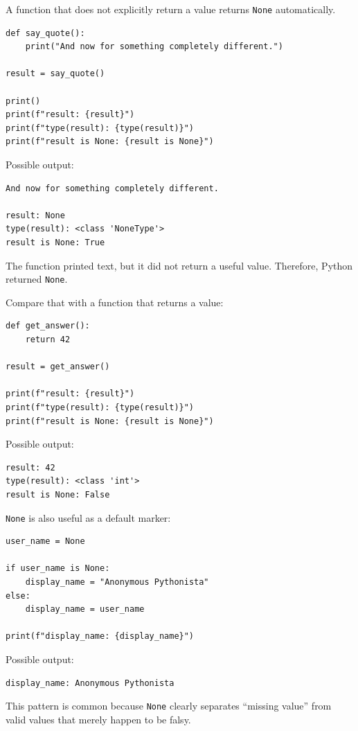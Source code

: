 A function that does not explicitly return a value returns \texttt{None} automatically.

\begin{verbatim}
def say_quote():
    print("And now for something completely different.")

result = say_quote()

print()
print(f"result: {result}")
print(f"type(result): {type(result)}")
print(f"result is None: {result is None}")
\end{verbatim}

Possible output:

\begin{verbatim}
And now for something completely different.

result: None
type(result): <class 'NoneType'>
result is None: True
\end{verbatim}

The function printed text, but it did not return a useful value. Therefore, Python returned \texttt{None}.

Compare that with a function that returns a value:

\begin{verbatim}
def get_answer():
    return 42

result = get_answer()

print(f"result: {result}")
print(f"type(result): {type(result)}")
print(f"result is None: {result is None}")
\end{verbatim}

Possible output:

\begin{verbatim}
result: 42
type(result): <class 'int'>
result is None: False
\end{verbatim}

\texttt{None} is also useful as a default marker:

\begin{verbatim}
user_name = None

if user_name is None:
    display_name = "Anonymous Pythonista"
else:
    display_name = user_name

print(f"display_name: {display_name}")
\end{verbatim}

Possible output:

\begin{verbatim}
display_name: Anonymous Pythonista
\end{verbatim}

This pattern is common because \texttt{None} clearly separates ``missing value'' from valid values that merely happen to be falsy.

